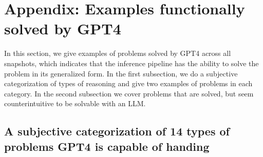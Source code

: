 \documentclass[11pt,a4paper]{article}
\begin{document}



\section{Appendix: Examples functionally solved by GPT4}
\label{appendix:gpt4-fn-solved-instances}

In this section, we give examples of problems solved by GPT4 across all snapshots, which indicates that the
inference pipeline has the ability to solve the problem in its generalized form.
In the first subsection, we do a subjective categorization of types of reasoning and give two examples
of problems in each category. In the second subsection we cover problems that are solved, but
seem counterintuitive to be solvable with an LLM.

\subsection{A subjective categorization of 14 types of problems GPT4 is capable of handing}
\end{document}
